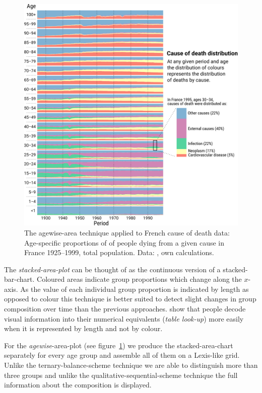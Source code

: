 \documentclass[parskip=half]{scrartcl}
\begin{document}
\begin{figure}[!htb]
  \centering
  \includegraphics[width = \textwidth]{./fig/agewise_area.pdf}
  \caption{The agewise-area technique applied to French cause of death data: Age-specific proportions of of people dying from a given cause in France 1925--1999, total population. Data: \cite{Vallin2014}, own calculations.}
  \label{fig:aag}
\end{figure}

The \emph{stacked-area-plot} can be thought of as the continuous version of a stacked-bar-chart. Coloured areas indicate group proportions which change along the $x$-axis. As the value of each individual group proportion is indicated by length as opposed to colour this technique is better suited to detect slight changes in group composition over time than the previous approaches. \textcite{Cleveland1984} show that people decode visual information into their numerical equivalents (\emph{table look-up}) more easily when it is represented by length and not by colour.

For the \emph{agewise}-area-plot (see figure~\ref{fig:aag}) we produce the stacked-area-chart separately for every age group and assemble all of them on a Lexis-like grid. Unlike the ternary-balance-scheme technique we are able to distinguish more than three groups and unlike the qualitative-sequential-scheme technique the full information about the composition is displayed.
\end{document}
